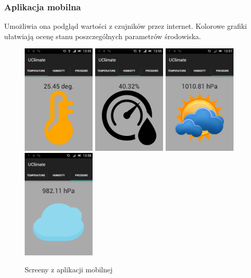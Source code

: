 \documentclass[12pt,a4paper]{article}
\begin{document}
\subsubsection{Aplikacja mobilna}
Umożliwia ona podgląd wartości z czujników przez internet. Kolorowe grafiki ułatwiają ocenę stanu poszczególnych parametrów środowiska. 
\begin{figure}[!h]	
\centering
	\includegraphics[width =35mm]{dev1.png}
	\includegraphics[width =35mm]{dev2.png}
	\includegraphics[width =35mm]{dev3.png}
	\includegraphics[width =35mm]{dev4.png}
	\label{ESP8266}
	\caption{Screeny z aplikacji mobilnej}
\end{figure}
\end{document}

